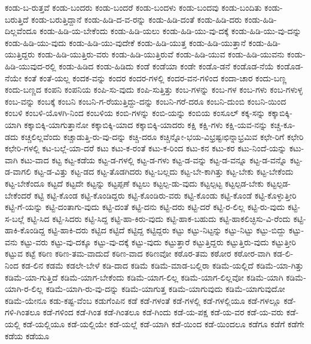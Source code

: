 {ಕಂಡು-ಬ-ರುತ್ತವೆ
ಕಂಡು-ಬಂದರು
ಕಂಡು-ಬಂದರೆ
ಕಂಡು-ಬಂದಳು
ಕಂಡು-ಬಂದವು
ಕಂಡು-ಬಂದಿತು
ಕಂಡು-ಬರುತ್ತಿದೆ
ಕಂಡು-ಬರುತ್ತಿದ್ದಾನೆ
ಕಂಡು-ಹಿಡಿ-ದ-ವ-ರನ್ನು
ಕಂಡು-ಹಿಡಿ-ದಂತೆ
ಕಂಡು-ಹಿಡಿ-ದರು
ಕಂಡು-ಹಿಡಿ-ದಿಲ್ಲವೆಂದೂ
ಕಂಡು-ಹಿಡಿ-ಯ-ಬೇಕೆಂದು
ಕಂಡು-ಹಿಡಿ-ಯಲು
ಕಂಡು-ಹಿಡಿ-ಯು-ವು-ದಕ್ಕೆ
ಕಂಡು-ಹಿಡಿ-ಯು-ವು-ದನ್ನು
ಕಂಡು-ಹಿಡಿ-ಯು-ವುದು
ಕಂಡು-ಹಿಡಿ-ಯು-ವುದೇಕೆ
ಕಂಡು-ಹಿಡಿ-ಯುತ್ತ
ಕಂಡು-ಹಿಡಿ-ಯುತ್ತಾನೆ
ಕಂಡು-ಹಿಡಿ-ಯುತ್ತಿದ್ದರು
ಕಂಡು-ಹಿಡಿ-ಯುತ್ತಿರು-ವರು
ಕಂಡು-ಹಿಡಿ-ಯುತ್ತಿರುವೆ
ಕಂಡು-ಹಿಡಿ-ಯುವ
ಕಂಡು-ಹಿಡಿ-ಯುವನು
ಕಂಡು-ಹಿಡಿ-ಯುವುದ-ರಲ್ಲಿ
ಕಂಡು-ಹಿಡಿದ
ಕಂಡು-ಹಿಡಿದು
ಕಂಡೆ
ಕಂಡೆಯಾ
ಕಂಡೇ
ಕಂಡೊ-ಡನೆ
ಕಂಡೊಡ-ನೆಯೆ
ಕಂಡೊಡ-ನೆಯೇ
ಕಂತೆ
ಕಂತೆ-ಯಲ್ಲ
ಕಂದಕ-ವನ್ನು
ಕಂದರ
ಕಂದರ-ಗಳಲ್ಲಿ
ಕಂದರ-ವನ-ಗಳಿಂದ
ಕಂದಾ-ಚಾರ
ಕಂದು-ಬಣ್ಣ
ಕಂದು-ಬಣ್ಣದ
ಕಂಪನಿ
ಕಂಪನಿಯ
ಕಂಪಿ-ಸು-ವುದು
ಕಂಪಿ-ಸುತ್ತಿತ್ತು
ಕಂಬ-ಗಳನ್ನು
ಕಂಬ-ಗಳ
ಕಂಬ-ಗಳು
ಕಂಬ-ಗಳುಳ್ಳ
ಕಂಬ-ವನ್ನು
ಕಂಬಕ್ಕೆ
ಕಂಬನಿ
ಕಂಬನಿ-ಗ-ರೆಯುತ್ತಿದ್ದು-ದನ್ನು
ಕಂಬನಿ-ಗರೆ-ದರೂ
ಕಂಬನಿ-ದುಂಬಿ
ಕಂಬನಿ-ಯಿಂದ
ಕಂಬಳಿ
ಕಂಬಳಿ-ಯೊಳಗಿ-ನಿಂದ
ಕಂಬಳಿಯ
ಕಂಬಿ-ಗಳನ್ನು
ಕಂಬಿ-ಯನ್ನು
ಕಂಬಿಯ
ಕಂಸೂಲ್
ಕಕ್ಕ-ಸನ್ನು
ಕಕ್ಕಾಬಿಕ್ಕಿ-ಯಾಗಿ
ಕಕ್ಕಾಬಿಕ್ಕಿ-ಯಾಗುತ್ತಾನೋ
ಕಕ್ಕಾಬಿಕ್ಕಿ-ಯಾದ
ಕಕ್ಕಾಬಿಕ್ಕಿ-ಯಾದರು
ಕಕ್ಷಿ
ಕಕ್ಷಿ-ಗಳು
ಕಕ್ಷಿ-ಯವ-ನನ್ನು
ಕಚ್ಚ-ಕೂ-ಡದು
ಕಚ್ಚಲಿಲ್ಲವೆಂದು
ಕಚ್ಚಾಡುತ್ತಿ-ರು-ವು-ದನ್ನು
ಕಚ್ಚಿ-ದರೂ
ಕಚ್ಚಿನ್ನೋ-ಭಯ-ವಿಭ್ರಷ್ಟಃಛಿನ್ನಾಭ್ರಮಿವ
ಕಛೇ-ರಿಗೆ
ಕಛೇರಿ
ಕಛೇರಿ-ಗಳಲ್ಲಿ
ಕಟ-ಬಲ್ಲೆ-ಯಾ-ದರೆ
ಕಟು
ಕಟು-ಕ-ರಂತೆ
ಕಟು-ಕ-ರಿಂದ
ಕಟು-ಕನ
ಕಟು-ಕರ
ಕಟು-ನಿಂದೆ-ಯನ್ನು
ಕಟು-ವಾಗಿ
ಕಟು-ವಾದ
ಕಟ್ಟ
ಕಟ್ಟ-ಕಡೆಯ
ಕಟ್ಟ-ಡ-ಗಳಲ್ಲಿ
ಕಟ್ಟ-ಡ-ಗಳು
ಕಟ್ಟ-ಡ-ವನ್ನು
ಕಟ್ಟ-ಡ-ವನ್ನೂ
ಕಟ್ಟ-ಡ-ವನ್ನೊ
ಕಟ್ಟ-ಡ-ವಾಗಲಿ
ಕಟ್ಟ-ಡ-ವಿತ್ತು
ಕಟ್ಟ-ಡದ
ಕಟ್ಟ-ತೊಡಗಿದರು
ಕಟ್ಟ-ಬಲ್ಲದು
ಕಟ್ಟ-ಬೇ-ಕಾಗಿತ್ತು
ಕಟ್ಟ-ಬೇಕು
ಕಟ್ಟ-ಬೇಕೆಂದು
ಕಟ್ಟ-ಬೇಕೆಂದೂ
ಕಟ್ಟದೆ
ಕಟ್ಟದೇ
ಕಟ್ಟನ್ನು
ಕಟ್ಟಪ್ಪಣೆ
ಕಟ್ಟಲು
ಕಟ್ಟಲ್ಪ-ಡು-ವುದು
ಕಟ್ಟಲ್ಪಟ್ಟ
ಕಟ್ಟಲ್ಪಡ-ಬೇಕು
ಕಟ್ಟಲ್ಪಡ-ಬೇಕೆಂದರೆ
ಕಟ್ಟಿ
ಕಟ್ಟಿ-ಕೊಂಡ
ಕಟ್ಟಿ-ಕೊಂಡಿದ್ದರು
ಕಟ್ಟಿ-ಕೊಂಡಿರು-ವರು
ಕಟ್ಟಿ-ಕೊಂಡು
ಕಟ್ಟಿ-ಕೊಂಡೆ
ಕಟ್ಟಿ-ಕೊಳ್ಳುತ್ತೀರಿ
ಕಟ್ಟಿ-ಗೆ-ಯನ್ನು
ಕಟ್ಟಿ-ದಂತಾಗು-ವುದು
ಕಟ್ಟಿ-ದಂತೆ
ಕಟ್ಟಿ-ದನು
ಕಟ್ಟಿ-ದರು
ಕಟ್ಟಿ-ದರೆ
ಕಟ್ಟಿ-ರ-ಲಿಲ್ಲ
ಕಟ್ಟಿ-ರು-ವುದು
ಕಟ್ಟಿ-ಸ-ಬಲ್ಲೆ
ಕಟ್ಟಿ-ಸಿದ
ಕಟ್ಟಿ-ಸಿದರು
ಕಟ್ಟಿ-ಸಿದ್ದ
ಕಟ್ಟಿ-ಹಾ-ಕಿರು-ವುದು
ಕಟ್ಟಿ-ಹಾಕ-ಬಹುದು
ಕಟ್ಟಿ-ಹಾಕಲಿಚ್ಛಿಸು-ವಿ-ರೆಂದು
ಕಟ್ಟಿ-ಹಾಕಿ-ಕೊಂಡಿದ್ದ
ಕಟ್ಟಿ-ಹಾಕಿ-ದರು
ಕಟ್ಟಿದ
ಕಟ್ಟಿದೆ
ಕಟ್ಟಿದ್ದ
ಕಟ್ಟಿದ್ದರು
ಕಟ್ಟು
ಕಟ್ಟು-ನಿಟ್ಟನ್ನು
ಕಟ್ಟು-ನಿಟ್ಟು
ಕಟ್ಟು-ಬಿದ್ದು
ಕಟ್ಟು-ವನು
ಕಟ್ಟು-ವರು
ಕಟ್ಟು-ವು-ದಕ್ಕೂ
ಕಟ್ಟು-ವು-ದಕ್ಕೆ
ಕಟ್ಟು-ವುದು
ಕಟ್ಟುತ್ತಾರೆ
ಕಟ್ಟುತ್ತಿದ್ದರು
ಕಟ್ಟುತ್ತಿರು-ವುದು
ಕಟ್ಟುತ್ತೀರಿ
ಕಟ್ಟುವ
ಕಟ್ಟೆ
ಕಠಿಣ
ಕಠಿಣ-ತಮ-ವಾದುದೆ
ಕಠಿಣ-ವಾದ
ಕಠಿಣವೋ
ಕಠೊರ-ತಮ
ಕಠೋರ
ಕಠೋರ-ವಾಗಿ
ಕಡ-ಲಿ-ನಿಂದ
ಕಡ-ಲಿನ
ಕಡಮೆ
ಕಡಲೇ-ಬೇಳೆ
ಕಡಿ-ದಾದ
ಕಡಿಮೆ
ಕಡಿಮೆ-ಮಾಡ-ಬಲ್ಲಿರಾ
ಕಡಿಮೆ-ಯಲ್ಲಿದೆ
ಕಡಿಮೆ-ಯಾ-ಗಿತ್ತು
ಕಡಿಮೆ-ಯಾ-ಗುತ್ತಿದೆ
ಕಡಿಮೆ-ಯಾಗ-ಬೇಕೆಂದು
ಕಡಿಮೆ-ಯಾಗ-ಲಿಲ್ಲ
ಕಡಿಮೆ-ಯಾಗ-ಲಿಲ್ಲವೋ
ಕಡಿಮೆ-ಯಾಗಿ
ಕಡಿಮೆ-ಯಾಗಿ-ರ-ಲಿಲ್ಲ
ಕಡಿಮೆ-ಯಾಗಿ-ರು-ವು-ದನ್ನು
ಕಡಿಮೆ-ಯಾಗುತ್ತ
ಕಡಿಮೆ-ಯಾಗುವುದು
ಕಡಿಮೆ-ಯಾಗುವುದೋ
ಕಡಿಮೆ-ಯೇನೂ
ಕಡು-ಕಷ್ಟ-ವೆಂಬ
ಕಡುಗೆಂಪಿನ
ಕಡೆ
ಕಡೆ-ಗಳಂತೆ
ಕಡೆ-ಗಳಲ್ಲಿ
ಕಡೆ-ಗಳಲ್ಲಿಯೂ
ಕಡೆ-ಗಳಲ್ಲೂ
ಕಡೆ-ಗಳಿ-ಗಿಂತಲೂ
ಕಡೆ-ಗಳಿಂದ
ಕಡೆ-ಗಿಂತ
ಕಡೆ-ಗಿಂತಲೂ
ಕಡೆ-ಗಿಂದು
ಕಡೆ-ಯ-ಪಕ್ಷ
ಕಡೆ-ಯ-ವರ
ಕಡೆ-ಯ-ವರು
ಕಡೆ-ಯಲ್ಲಿ
ಕಡೆ-ಯಲ್ಲಿಯೂ
ಕಡೆ-ಯಲ್ಲಿಯೇ
ಕಡೆ-ಯಲ್ಲೆ
ಕಡೆ-ಯಾಗಿ
ಕಡೆ-ಯಿಂದ
ಕಡೆ-ಯಿಂದಲೂ
ಕಡೆಗೂ
ಕಡೆಗೆ
ಕಡೆಗೇ
ಕಡೆಯ
ಕಡೆಯೂ
}
